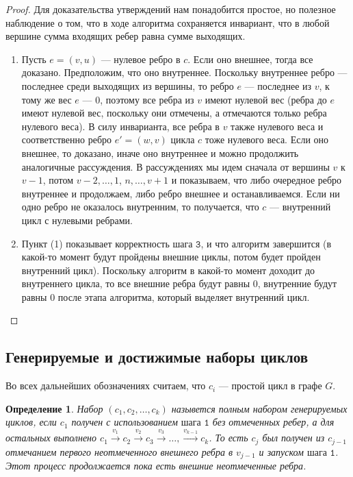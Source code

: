 \documentclass{article}
\newtheorem{definition}{Определение}
\begin{document}
\begin{proof}
Для доказательства утверждений нам понадобится простое, но полезное наблюдение о том, что в ходе алгоритма сохраняется инвариант, что в любой вершине сумма входящих ребер равна сумме выходящих.


\begin{enumerate}
    \item Пусть $e = (v, u)$ --- нулевое ребро в $c$. Если оно внешнее, тогда все доказано. Предположим, что оно внутреннее. Поскольку внутреннее ребро --- последнее среди выходящих из вершины, то ребро $e$ --- последнее из $v$, к тому же вес $e$ --- $0$, поэтому все ребра из $v$ имеют нулевой вес (ребра до $e$ имеют нулевой вес, поскольку они отмечены, а отмечаются только ребра нулевого веса). В силу инварианта, все ребра в $v$ также нулевого веса и соответственно ребро $e' = (w, v)$ цикла $c$ тоже нулевого веса. Если оно внешнее, то доказано, иначе оно внутреннее и можно продолжить аналогичные рассуждения. В рассуждениях мы идем сначала от вершины $v$ к $v - 1$, потом $v - 2, \ldots, 1$, $n, \ldots, v + 1$ и показываем, что либо очередное ребро внутреннее и продолжаем, либо ребро внешнее и останавливаемся. Если ни одно ребро не оказалось внутренним, то получается, что $c$ --- внутренний цикл с нулевыми ребрами. 
    \item Пункт (1) показывает корректность $\texttt{шага 3}$, и что алгоритм завершится (в какой-то момент будут пройдены внешние циклы, потом будет пройден внутренний цикл).
    Поскольку алгоритм в какой-то момент доходит до внутреннего цикла, то все внешние ребра будут равны $0$, внутренние будут равны $0$ после этапа алгоритма, который выделяет внутренний цикл.
\end{enumerate}
\end{proof}

\subsection{Генерируемые и достижимые наборы циклов}


Во всех дальнейших обозначениях считаем, что $c_{i}$ --- простой цикл в графе $G$.

\begin{definition}
    Набор $(c_{1}, c_{2}, \ldots, c_{k})$ назывется полным набором генерируемых циклов, если $c_{1}$ получен с использованием $\texttt{шага 1}$ без отмеченных ребер, а для остальных выполнено $c_{1} \xrightarrow{v_{1}} c_{2} \xrightarrow{v_{2}}c_{3}\xrightarrow{v_{3}} \ldots, \xrightarrow{v_{k - 1}}c_{k}$. То есть $c_{j}$ был получен из $c_{j - 1}$ отмечанием первого неотмеченного внешнего ребра в $v_{j - 1}$ и запуском $\texttt{шага 1}$. Этот процесс продолжается пока есть внешние неотмеченные ребра.
\end{definition}
\end{document}
